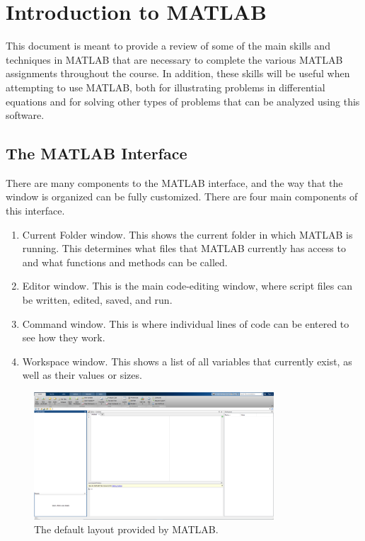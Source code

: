 \chapter{Introduction to MATLAB}
\label{matlab:appendix}
\renewcommand{\thesection}{\thechapter.\the\value{section}}

This document is meant to provide a review of some of the main skills and techniques in MATLAB that are necessary to complete the various MATLAB assignments throughout the course. In addition, these skills will be useful when attempting to use MATLAB, both for illustrating problems in differential equations and for solving other types of problems that can be analyzed using this software.

\section{The MATLAB Interface}

There are many components to the MATLAB interface, and the way that the window is organized can be fully customized. There are four main components of this interface.
\begin{enumerate}
    \item Current Folder window. This shows the current folder in which MATLAB is running. This determines what files that MATLAB currently has access to and what functions and methods can be called.
    \item Editor window. This is the main code-editing window, where script files can be written, edited, saved, and run.
    \item Command window. This is where individual lines of code can be entered to see how they work. 
    \item Workspace window. This shows a list of all variables that currently exist, as well as their values or sizes.
\end{enumerate}

\begin{figure}[h]
    \centering
    \includegraphics[width=0.8\textwidth]{Images/MatlabDemo_layout.png}
    \caption{The default layout provided by MATLAB.}
    \label{fig:MatlabDemo_Layout}
\end{figure}

